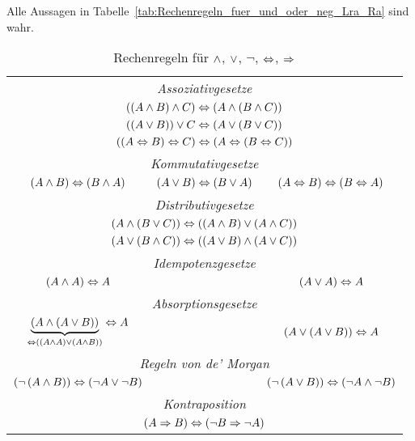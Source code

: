 \begin{theorem}
Alle Aussagen in Tabelle~\vref{tab:Rechenregeln_fuer_und_oder_neg_Lra_Ra} sind wahr.
\begin{table}[htb]
\centering
\begin{tabular}{ccc}
\toprule
\multicolumn{3}{c}{\emph{Assoziativgesetze}}\\
\multicolumn{3}{c}{$\left(\left(A \wedge B\right) \wedge C\right) \Leftrightarrow \left(A \wedge \left(B \wedge C\right)\right)$}\\
\multicolumn{3}{c}{$\left(\left(A \vee B\right)\right) \vee C \Leftrightarrow \left(A \vee \left(B \vee C\right)\right)$}\\
\multicolumn{3}{c}{$\left(\left(A \Leftrightarrow B\right) \Leftrightarrow C\right) \Leftrightarrow \left(A \Leftrightarrow \left(B \Leftrightarrow C\right)\right)$}\\
\midrule

\multicolumn{3}{c}{\emph{Kommutativgesetze}}\\
$\left(A \wedge B\right) \Leftrightarrow \left(B \wedge A\right)$ &
$\left(A \vee B\right) \Leftrightarrow \left(B \vee A\right)$ &
$\left(A \Leftrightarrow B\right) \Leftrightarrow \left(B \Leftrightarrow A\right)$\\
\midrule

\multicolumn{3}{c}{\emph{Distributivgesetze}}\\
\multicolumn{3}{c}{$\left(A \wedge \left(B \vee C\right)\right) \Leftrightarrow \left(\left(A \wedge B\right) \vee \left(A \wedge C\right)\right)$}\\
\multicolumn{3}{c}{$\left(A \vee \left(B \wedge C\right)\right) \Leftrightarrow \left(\left(A \vee B\right) \wedge \left(A \vee C\right)\right)$}\\
\midrule

\multicolumn{3}{c}{\emph{Idempotenzgesetze}}\\
$\left(A \wedge A\right) \Leftrightarrow A$ & & $\left(A \vee A\right) \Leftrightarrow A$\\
\midrule

\multicolumn{3}{c}{\emph{Absorptionsgesetze}}\\
$\underbrace{\left(A \wedge \left(A \vee B\right)\right)}_{\Leftrightarrow \left(\left(A \wedge A\right) \vee \left(A \wedge B\right)\right)} \Leftrightarrow A$ & & $\left(A \vee \left(A \vee B\right)\right) \Leftrightarrow A$\\
\midrule

\multicolumn{3}{c}{\emph{Regeln von de' Morgan}}\\
$\left(\neg \left(A \wedge B\right)\right) \Leftrightarrow \left(\neg A \vee \neg B\right)$ & & $\left(\neg \left(A \vee B\right)\right) \Leftrightarrow \left(\neg A \wedge \neg B\right)$\\
\midrule

\multicolumn{3}{c}{\emph{Kontraposition}}\\
\multicolumn{3}{c}{$\left(A \Rightarrow B\right) \Leftrightarrow \left(\neg B \Rightarrow \neg A\right)$}\\
\bottomrule
\end{tabular}
\label{tab:Rechenregeln_fuer_und_oder_neg_Lra_Ra}
\caption{Rechenregeln für $\wedge$, $\vee$, $\neg$, $\Leftrightarrow$, $\Rightarrow$}
\end{table}
\label{the:Satz_1_10}
\end{theorem}

